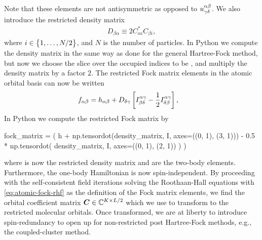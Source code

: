             Note that these elements are not antisymmetric as opposed to
            $u^{\alpha\beta}_{\gamma\delta}$.
            We also introduce the restricted density matrix
            \begin{align}
                D_{\beta \alpha}
                \equiv 2 C^{*}_{\alpha i} C_{\beta i},
            \end{align}
            where $i \in \left\{ 1, \dots, N / 2 \right\}$, and $N$ is the number of
            particles.
            In Python we compute the density matrix in the same way as done for
            the general Hartree-Fock method, but now we choose the slice over
            the occupied indices to be , and multiply
            the density matrix by a factor $2$.
            The restricted Fock matrix elements in the atomic orbital basis can
            now be written
            \begin{align}
                f_{\alpha\beta}
                &=
                h_{\alpha\beta}
                + D_{\delta\gamma}
                \left[ 
                    I^{\alpha\gamma}_{\beta\delta}
                    -
                    \frac{1}{2}
                    I^{\alpha\gamma}_{\delta\beta}
                 \right],
                \label{eq:atomic-fock-rhf}
            \end{align}
            In Python we compute the restricted Fock matrix by
            \begin{python}
fock_matrix = (
    h
    + np.tensordot(density_matrix, I, axes=((0, 1), (3, 1)))
    - 0.5 * np.tensordot(
        density_matrix, I, axes=((0, 1), (2, 1))
    )
)
            \end{python}
            where  is now the restricted density matrix and
             are the two-body elements.
            Furthermore, the one-body Hamiltonian  is now
            spin-independent.
            By proceeding with the self-consistent field iterations solving the
            Roothaan-Hall equations with \autoref{eq:atomic-fock-rhf} as the
            definition of the Fock matrix elements, we find the orbital
            coefficient matrix $\boldsymbol{C} \in \mathbb{C}^{K \times L/2}$ which we
            use to transform to the restricted molecular orbitals.
            Once transformed, we are at liberty to introduce spin-redundancy to
            open up for non-restricted post Hartree-Fock methods, e.g., the
            coupled-cluster method.

